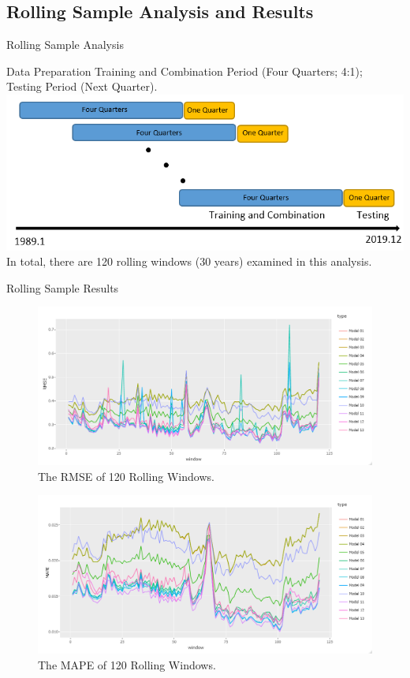 \documentclass{beamer}
\begin{document}
\subsection{Rolling Sample Analysis and Results}

\begin{frame}[t]{Rolling Sample Analysis}
\begin{block}{Data Preparation}
\vspace{0.5em}
Training and Combination Period (Four Quarters; 4:1);\\
Testing Period (Next Quarter).
\includegraphics[scale=0.56]{rolling_windows}
In total, there are 120 rolling windows (30 years) examined in this analysis.
\end{block}
\end{frame}

\begin{frame}[t]{Rolling Sample Results}
\vspace*{-\baselineskip}
\begin{figure}
\caption{The RMSE of 120 Rolling Windows.}
\includegraphics[scale=0.2]{rmse_rolling}
\end{figure}
\vspace*{-\baselineskip}
\begin{figure}
\caption{The MAPE of 120 Rolling Windows.}
\includegraphics[scale=0.2]{mape_rolling}
\end{figure}

\end{frame}
\end{document}
